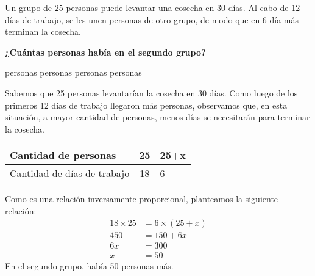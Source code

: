 \question[10] Un grupo de 25 personas puede levantar una cosecha en 30 días. Al cabo de 12 días de trabajo,
se les unen personas de otro grupo, de modo que en 6 día
más terminan la cosecha.

\textbf{¿Cuántas personas había en el segundo grupo?}

\begin{oneparchoices}
     personas
     personas
     personas
     personas
\end{oneparchoices}


\begin{solutionbox}{8cm}
    Sabemos que 25 personas levantarían la cosecha en 30 días. Como luego de los primeros 12 días de trabajo llegaron más personas, observamos que, en esta situación, a mayor cantidad de personas, menos días se necesitarán para terminar la cosecha.
    \begin{table}[H]
        \centering
        \begin{tabular}{|l|c|l|}
            \hline
            Cantidad de personas        & 25 & 25+x \\
            \hline
            Cantidad de días de trabajo & 18 & 6    \\
            \hline
        \end{tabular}
    \end{table}
    Como es una relación inversamente proporcional, planteamos la siguiente relación:
    \begin{align*}
        18 \times 25 & = 6 \times (25+x) \\
        450          & = 150 +6x         \\
        6x           & = 300             \\
        x            & = 50
    \end{align*}
    En el segundo grupo, había 50 personas más.
\end{solutionbox}
